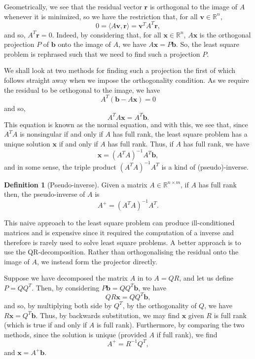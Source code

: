 \documentclass[
]{article}
\theoremstyle{definition}
\theoremstyle{definition}
\newtheorem{definition}{Definition}[section]
\begin{document}
Geometrically, we see that the residual vector \(\mathbf{r}\) is
orthogonal to the image of \(A\) whenever it is minimized, so we have
the restriction that, for all \(\mathbf{v} \in \mathbb{R}^n\),
\[0 = \langle A\mathbf{v}, \mathbf{r} \rangle = \mathbf{v}^TA^T\mathbf{r},\]
and so, \(A^T \mathbf{r} = 0\). Indeed, by considering that, for all
\(\mathbf{x} \in \mathbb{R}^n\), \(A\mathbf{x}\) is the orthogonal
projection \(P\) of \(\mathbf{b}\) onto the image of \(A\), we have
\(A\mathbf{x} = P\mathbf{b}\). So, the least square problem is rephrased
such that we need to find such a projection \(P\).

We shall look at two methods for finding such a projection the first of
which follows straight away when we impose the orthogonality condition.
As we require the residual to be orthogonal to the image, we have
\[A^T(\mathbf{b} - A\mathbf{x}) = 0\] and so,
\[A^TA \mathbf{x} = A^T \mathbf{b}.\] This equation is known as the
normal equation, and with this, we see that, since \(A^T A\) is
nonsingular if and only if \(A\) has full rank, the least square problem
has a unique solution \(\mathbf{x}\) if and only if \(A\) has full rank.
Thus, if \(A\) has full rank, we have
\[\mathbf{x} = (A^T A)^{-1} A^T \mathbf{b},\] and in some sense, the
triple product \((A^T A)^{-1} A^T\) is a kind of (pseudo)-inverse.

\begin{definition}[Pseudo-inverse]
  Given a matrix \(A \in \mathbb{R}^{n \times m}\), if \(A\) has full rank then, 
  the pseudo-inverse of \(A\) is 
  \[A^+ = (A^T A)^{-1} A^T.\]
\end{definition}

This naive approach to the least square problem can produce
ill-conditioned matrices and is expensive since it required the
computation of a inverse and therefore is rarely used to solve least
square problems. A better approach is to use the QR-decomposition.
Rather than orthogonalising the residual onto the image of \(A\), we
instead form the projector directly.

Suppose we have decomposed the matrix \(A\) in to \(A = QR\), and let us
define \(P = Q Q^T\). Then, by considering
\(P\mathbf{b} = QQ^T \mathbf{b}\), we have
\[QR \mathbf{x} = QQ^T \mathbf{b},\] and so, by multiplying both side by
\(Q^T\), by the orthogonality of \(Q\), we have
\(R\mathbf{x} = Q^T\mathbf{b}\). Thus, by backwards substitution, we may
find \(\mathbf{x}\) given \(R\) is full rank (which is true if and only
if \(A\) is full rank). Furthermore, by comparing the two methods, since
the solution is unique (provided \(A\) if full rank), we find
\[A^+ = R^{-1} Q^T,\] and \(\mathbf{x} = A^+\mathbf{b}\).
\end{document}
